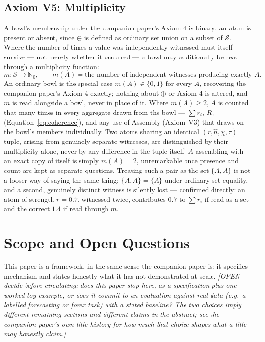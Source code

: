 \documentclass[12pt, a4paper]{article}
\begin{document}
\subsection{Axiom V5: Multiplicity}
\label{axiom:v5}
A bowl's membership under the companion paper's Axiom 4 is binary:
an atom is present or absent, since $\oplus$ is defined as ordinary
set union on a subset of $\mathcal{S}$. Where the number of times a
value was independently witnessed must itself survive --- not
merely whether it occurred --- a bowl may additionally be read
through a multiplicity function:
\[
m:\mathcal{S}\to\mathbb{N}_0, \qquad
m(A) = \text{the number of independent witnesses producing exactly } A.
\]
An ordinary bowl is the special case $m(A)\in\{0,1\}$ for every $A$,
recovering the companion paper's Axiom 4 exactly; nothing about
$\oplus$ or Axiom 4 is altered, and $m$ is read alongside a bowl,
never in place of it. Where $m(A)\ge 2$, $A$ is counted that many
times in every aggregate drawn from the bowl --- $\sum r_i$, $\bar
R_c$ (Equation~\eqref{eq:coherence}), and any use of Assembly
(Axiom~V3) that draws on the bowl's members individually. Two atoms
sharing an identical $(r,\hat n,\chi,\tau)$ tuple, arising from
genuinely separate witnesses, are distinguished by their
multiplicity alone, never by any difference in the tuple itself:
$A$ assembling with an exact copy of itself is simply $m(A)=2$,
unremarkable once presence and count are kept as separate
questions. Treating such a pair as the set $\{A,A\}$ is not a
looser way of saying the same thing; $\{A,A\}=\{A\}$ under ordinary
set equality, and a second, genuinely distinct witness is silently
lost --- confirmed directly: an atom of strength $r=0.7$, witnessed
twice, contributes $0.7$ to $\sum r_i$ if read as a set and the
correct $1.4$ if read through $m$.

\section{Scope and Open Questions}
\label{sec:scope}

This paper is a framework, in the same sense the companion paper is:
it specifies mechanism and states honestly what it has not
demonstrated at scale. \emph{[OPEN --- decide before circulating: does
this paper stop here, as a specification plus one worked toy example,
or does it commit to an evaluation against real data (e.g.\ a labelled
forecasting or forex task) with a stated baseline? The two choices
imply different remaining sections and different claims in the
abstract; see the companion paper's own title history for how much
that choice shapes what a title may honestly claim.]}
\end{document}
